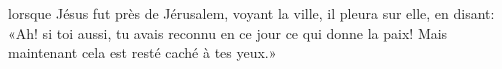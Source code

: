 \encetemps lorsque Jésus fut près de Jérusalem,
	voyant la ville, il pleura sur elle, en disant:
	«Ah! si toi aussi, tu avais reconnu en ce jour ce qui donne la paix!
	Mais maintenant cela est resté caché à tes yeux.»
